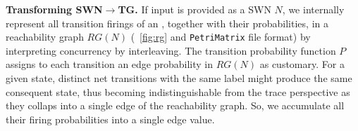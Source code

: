\medskip

\textbf{Transforming SWN$\to$TG.} If input is provided as a SWN $N$,  we internally represent all transition firings of an \uswn, together with their probabilities, in a reachability graph $RG(N)$ (\figurename~\ref{fig:rg} and \texttt{PetriMatrix} file format) by interpreting concurrency by interleaving. The transition probability function $P$ assigns to each transition an edge probability in $RG(N)$ as customary.  %
For a given state, distinct net transitions with the same label might produce the same consequent state, thus becoming indistinguishable from the trace perspective as they collaps into a single edge of the reachability graph. So, we accumulate all their firing probabilities into a single edge value. 
